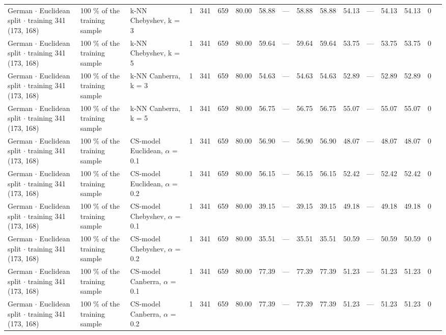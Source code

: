 \begin{longtable}{lllrrrrrrrrrrrrrl}
  German $\cdot$ Euclidean split $\cdot$ training 341 (173, 168) & 100 \% of the training sample & k-NN Chebyshev, k = 3 & 1 & 341 & 659 & 80.00 & 58.88 & --- & 58.88 & 58.88 & 54.13 & --- & 54.13 & 54.13 & 0 &  \\
  German $\cdot$ Euclidean split $\cdot$ training 341 (173, 168) & 100 \% of the training sample & k-NN Chebyshev, k = 5 & 1 & 341 & 659 & 80.00 & 59.64 & --- & 59.64 & 59.64 & 53.75 & --- & 53.75 & 53.75 & 0 &  \\
  German $\cdot$ Euclidean split $\cdot$ training 341 (173, 168) & 100 \% of the training sample & k-NN Canberra, k = 3 & 1 & 341 & 659 & 80.00 & 54.63 & --- & 54.63 & 54.63 & 52.89 & --- & 52.89 & 52.89 & 0 &  \\
  German $\cdot$ Euclidean split $\cdot$ training 341 (173, 168) & 100 \% of the training sample & k-NN Canberra, k = 5 & 1 & 341 & 659 & 80.00 & 56.75 & --- & 56.75 & 56.75 & 55.07 & --- & 55.07 & 55.07 & 0 &  \\
  German $\cdot$ Euclidean split $\cdot$ training 341 (173, 168) & 100 \% of the training sample & CS-model Euclidean, $\alpha$ = 0.1 & 1 & 341 & 659 & 80.00 & 56.90 & --- & 56.90 & 56.90 & 48.07 & --- & 48.07 & 48.07 & 0 &  \\
  German $\cdot$ Euclidean split $\cdot$ training 341 (173, 168) & 100 \% of the training sample & CS-model Euclidean, $\alpha$ = 0.2 & 1 & 341 & 659 & 80.00 & 56.15 & --- & 56.15 & 56.15 & 52.42 & --- & 52.42 & 52.42 & 0 &  \\
  German $\cdot$ Euclidean split $\cdot$ training 341 (173, 168) & 100 \% of the training sample & CS-model Chebyshev, $\alpha$ = 0.1 & 1 & 341 & 659 & 80.00 & 39.15 & --- & 39.15 & 39.15 & 49.18 & --- & 49.18 & 49.18 & 0 &  \\
  German $\cdot$ Euclidean split $\cdot$ training 341 (173, 168) & 100 \% of the training sample & CS-model Chebyshev, $\alpha$ = 0.2 & 1 & 341 & 659 & 80.00 & 35.51 & --- & 35.51 & 35.51 & 50.59 & --- & 50.59 & 50.59 & 0 &  \\
  German $\cdot$ Euclidean split $\cdot$ training 341 (173, 168) & 100 \% of the training sample & CS-model Canberra, $\alpha$ = 0.1 & 1 & 341 & 659 & 80.00 & 77.39 & --- & 77.39 & 77.39 & 51.23 & --- & 51.23 & 51.23 & 0 &  \\
  German $\cdot$ Euclidean split $\cdot$ training 341 (173, 168) & 100 \% of the training sample & CS-model Canberra, $\alpha$ = 0.2 & 1 & 341 & 659 & 80.00 & 77.39 & --- & 77.39 & 77.39 & 51.23 & --- & 51.23 & 51.23 & 0 &  \\

\end{longtable}

